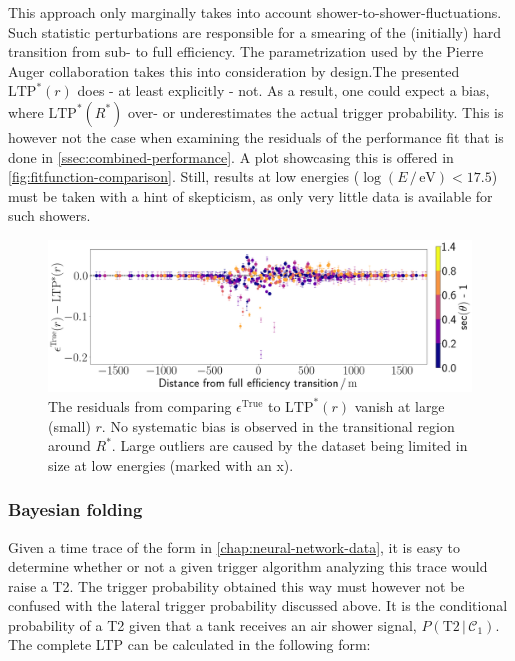 This approach only marginally takes into account shower-to-shower-fluctuations. Such statistic perturbations are responsible for a smearing of the (initially)
hard transition from sub- to full efficiency. The parametrization used by the Pierre Auger collaboration takes this into consideration by design.The presented 
$\text{LTP}^*(r)$ does - at least explicitly - not. As a result, one could expect a bias, where $\text{LTP}^*(R^*)$ over- or underestimates the actual trigger 
probability. This is however not the case when examining the residuals of the performance fit that is done in \autoref{ssec:combined-performance}. A plot 
showcasing this is offered in \autoref{fig:fitfunction-comparison}. Still, results at low energies ($\log(E\,/\,\mathrm{eV}) < 17.5$) must be taken with a hint of 
skepticism, as only very little data is available for such showers.

\begin{figure}
	\centering
	\includegraphics[width=1\textwidth]{./plots/LTP_bias_check.png}
	\caption{The residuals from comparing $\epsilon^\text{True}$ to $\text{LTP}^*(r)$ vanish at large (small) $r$. No systematic bias is observed in the 
	transitional region around $R^*$. Large outliers are caused by the dataset being limited in size at low energies (marked with an x).}
	\label{fig:fitfunction-comparison}
\end{figure}

\subsubsection{Bayesian folding}
\label{sssec:bayesian-folding}

Given a time trace of the form in \autoref{chap:neural-network-data}, it is easy to determine whether or not a given trigger algorithm analyzing this trace would
raise a T2. The trigger probability obtained this way must however not be confused with the lateral trigger probability discussed above. It is the conditional 
probability of a T2 given that a tank receives an air shower signal, $P(\text{T2}\,|\,\mathcal{C}_1)$. The complete LTP can be calculated in the following form:

